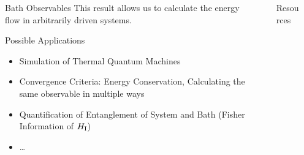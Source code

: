 \documentclass[final]{beamer}
\newlength{\sepwidth}
\newlength{\colwidth}
\newcommand{\separatorcolumn}{\begin{column}{\sepwidth}\end{column}}
\begin{document}
\begin{frame}[t]
\begin{columns}[t]
\begin{column}{\colwidth}
\begin{alertblock}{Bath Observables}
    This result allows us to calculate the energy flow in arbitrarily
    driven systems.
  \end{alertblock}
  \begin{block}{Possible Applications}
    \begin{itemize}
    \item Simulation of Thermal Quantum Machines
    \item Convergence Criteria: Energy Conservation, Calculating the
      same observable in multiple ways
    \item Quantification of Entanglement of System and Bath (Fisher
      Information of \(H_{\mathrm{I}}\))
    \item \ldots
    \end{itemize}
  \end{block}
\end{column}

\separatorcolumn

\begin{column}{\colwidth}
  \begin{block}{Resources}
    \printbibliography
  \end{block}
\end{column}

\separatorcolumn
\end{columns}
\end{frame}
\end{document}
